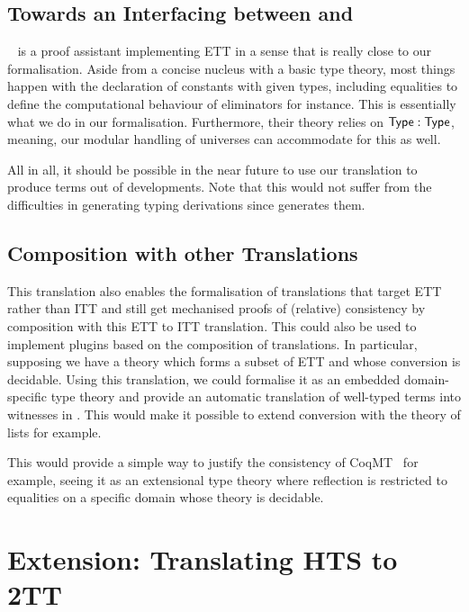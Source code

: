 \subsection{Towards an Interfacing between \Andromeda and \Coq}

\Andromeda~ is a proof assistant implementing ETT in a sense
that is really close to our formalisation. Aside from a concise nucleus with
a basic type theory, most things happen with the declaration of constants
with given types, including equalities to define the computational behaviour
of eliminators for instance.
This is essentially what we do in our formalisation.
Furthermore, their theory relies on $\mathsf{Type} : \mathsf{Type}$, meaning, our modular
handling of universes can accommodate for this as well.

All in all, it should be possible in the near future to use our translation
to produce \Coq terms out of \Andromeda developments.
%
Note that this would not suffer from the difficulties in generating typing
derivations since \Andromeda generates them.

\subsection{Composition with other Translations}

This translation also enables the formalisation of translations that
target ETT rather than ITT and still get mechanised proofs of (relative)
consistency by composition with this ETT to ITT translation.  This could
also be used to implement plugins based on the composition of
translations. In particular, supposing we have a theory which forms a
subset of ETT and whose conversion is decidable. Using this translation,
we could formalise it as an embedded domain-specific type theory and
provide an automatic translation of well-typed terms into witnesses in
\Coq. This would make it possible to extend conversion with the theory
of lists for example.

This would provide a simple way to justify the consistency of
CoqMT~ for example, seeing it as an
extensional type theory where reflection is restricted to equalities
on a specific domain whose theory is decidable.


\section{Extension: Translating HTS to 2TT}
\label{sec:extens-transl-hts}

